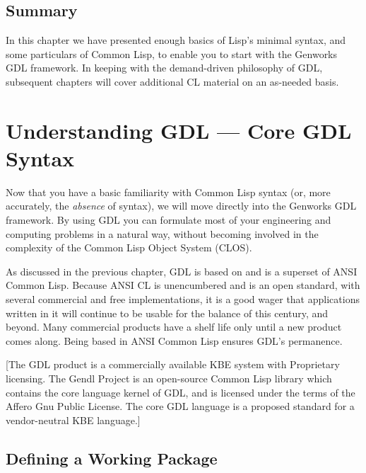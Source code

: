 \documentclass [11pt]{book}
\begin{document}
\section{Summary}

\label{sec:summary}

In this chapter we have presented enough basics of Lisp's
minimal syntax, and some particulars of Common Lisp, to enable you to
start with the Genworks GDL framework. In keeping with the
demand-driven philosophy of GDL, subsequent chapters will cover additional
CL material on an as-needed basis.

\chapter{Understanding GDL --- Core GDL Syntax}

\label{chap:understandinggdl---coregdlsyntax}



Now that you have a basic familiarity with Common Lisp
      syntax (or, more accurately, the \emph{absence} of syntax), we will move directly into the Genworks GDL
framework. By using GDL you can formulate most of your engineering and
computing problems in a natural way, without becoming involved in the
complexity of the Common Lisp Object System (CLOS).



As discussed in the previous chapter, GDL is based on and
is a superset of ANSI Common Lisp. Because ANSI CL is unencumbered and
is an open standard, with several commercial and free implementations,
it is a good wager that applications written in it will continue to be
usable for the balance of this century, and beyond. Many commercial
products have a shelf life only until a new product comes along. Being
based in ANSI Common Lisp ensures GDL's permanence.



[The GDL product is a commercially available KBE system
with Proprietary licensing.  The Gendl Project is an open-source
Common Lisp library which contains the core language kernel of GDL,
and is licensed under the terms of the Affero Gnu Public License. The
core GDL language is a proposed standard for a vendor-neutral KBE
language.]



\section{Defining a Working Package}
\end{document}
